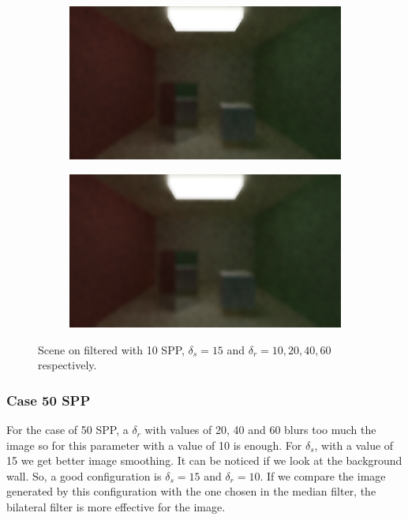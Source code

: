 \documentclass[titlepage,12pt]{report}
\begin{document}
\begin{figure}[H]
	\begin{subfigure}{.48\textwidth}
		\centering
		\includegraphics[scale=0.2]{media/bilateral/cornell_normal_10_bilateral_filter_21_15_40.png}
		\label{bilateral_filter_11}
	\end{subfigure}
	\begin{subfigure}{.48\textwidth}
		\centering
		\includegraphics[scale=0.2]{media/bilateral/cornell_normal_10_bilateral_filter_21_15_60.png}
		\label{bilateral_filter_12}
	\end{subfigure}
	\caption{Scene on filtered with 10 SPP, $\delta_s = 15$ and $\delta_r = 10, 20, 40, 60$ respectively.}
	\label{bilateral_filter_03}
\end{figure}

\subsubsection{Case 50 SPP}

For the case of 50 SPP, a $\delta_r$ with values of 20, 40 and 60 blurs too much the image so for this parameter with a value of 10 is enough. For $\delta_s$, with a value of 15 we get better image smoothing. It can be noticed if we look at the background wall. So, a good configuration is $\delta_s = 15$ and $\delta_r = 10$. If we compare the image generated by this configuration with the one chosen in the median filter, the bilateral filter is more effective for the image.
\end{document}
